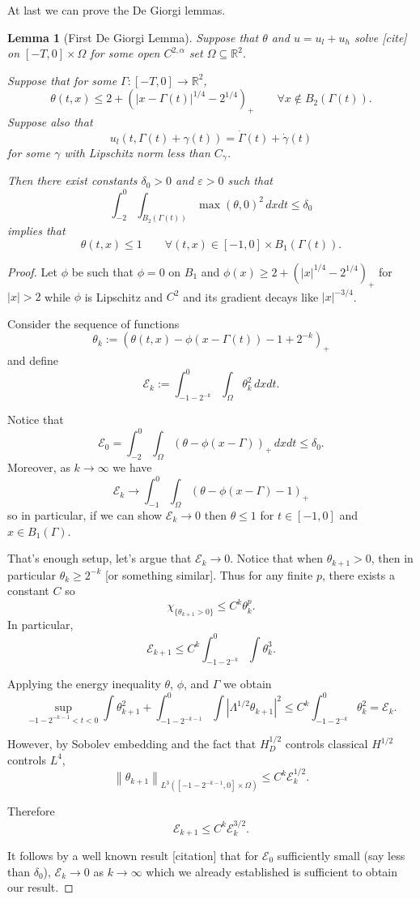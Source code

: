 \documentclass[11pt]{amsart}
\newtheorem{lemma}[theorem]{Lemma}
\theoremstyle{remark}
\theoremstyle{definition}
\newcommand{\R}{\mathbb{R}}
\newcommand{\E}{\mathcal{E}}
\newcommand{\eps}{\varepsilon}
\newcommand{\norm}[1]{\left\lVert#1\right\rVert}
\newcommand{\paren}[1]{\left( #1 \right)}
\newcommand{\abs}[1]{\left\lvert #1 \right\rvert}
\newcommand{\indic}[1]{\chi_{\{#1\}}}
\newcommand{\ulow}{u_l}
\newcommand{\uhigh}{u_h}
\begin{document}
At last we can prove the De Giorgi lemmas.  

\begin{lemma}[First De Giorgi Lemma] \label{thm:DG1}
Suppose that $\theta$ and $u = \ulow + \uhigh$ solve [cite] on $[-T,0]\times \Omega$ for some open $C^{2,\alpha}$ set $\Omega \subseteq \R^2$.  

Suppose that for some $\Gamma:[-T,0]\to \R^2$, 
\[ \theta(t,x) \leq 2 + \paren{|x-\Gamma(t)|^{1/4}-2^{1/4}}_+ \qquad \forall x \notin B_2(\Gamma(t)). \]
Suppose also that
\[ \ulow(t,\Gamma(t)+\gamma(t)) = \dot{\Gamma}(t) + \dot{\gamma}(t) \]
for some $\gamma$ with Lipschitz norm less than $C_\gamma$.  

Then there exist constants $\delta_0>0$ and $\eps > 0$ such that
\[ \int_{-2}^0 \int_{B_2(\Gamma(t))} \max(\theta,0)^2 \,dxdt \leq \delta_0 \]
implies that
\[ \theta(t,x) \leq 1 \qquad \forall (t,x) \in [-1,0]\times B_1(\Gamma(t)). \]

\end{lemma}

\begin{proof}
Let $\phi$ be such that $\phi = 0$ on $B_1$ and $\phi(x) \geq 2 + \paren{|x|^{1/4}-2^{1/4}}_+$ for $|x|>2$ while $\phi$ is Lipschitz and $C^2$ and its gradient decays like $|x|^{-3/4}$.  

Consider the sequence of functions
\[ \theta_k := (\theta(t,x) - \phi(x - \Gamma(t)) - 1 + 2^{-k})_+ \]
and define
\[ \E_k := \int_{-1-2^{-k}}^0 \int_\Omega \theta_k^2 \,dxdt. \]

Notice that
\[ \E_0 = \int_{-2}^0 \int_\Omega (\theta - \phi(x-\Gamma))_+ \,dxdt \leq \delta_0. \]
Moreover, as $k \to \infty$ we have
\[ \E_k \to \int_{-1}^0 \int_\Omega (\theta - \phi(x-\Gamma) - 1)_+ \]
so in particular, if we can show $\E_k \to 0$ then $\theta \leq 1$ for $t \in [-1,0]$ and $x \in B_1(\Gamma)$.  

That's enough setup, let's argue that $\E_k \to 0$.  Notice that when $\theta_{k+1}>0$, then in particular $\theta_k \geq 2^{-k}$ [or something similar].  Thus for any finite $p$, there exists a constant $C$ so
\[ \indic{\theta_{k+1}>0} \leq C^k \theta_k^p. \]
In particular,
\[ \E_{k+1} \leq C^k \int_{-1-2^{-k}}^0 \int \theta_k^3. \]

Applying the energy inequality $\theta$, $\phi$, and $\Gamma$ we obtain
\[ \sup_{-1-2^{-k-1}<t<0} \int \theta_{k+1}^2 + \int_{-1-2^{-k-1}}^0 \int \abs{\Lambda^{1/2}\theta_{k+1}}^2 \leq C^k \int_{-1-2^{-k}}^0 \theta_k^2 = \E_k. \]

However, by Sobolev embedding and the fact that $H_D^{1/2}$ controls classical $H^{1/2}$ controls $L^4$,
\[ \norm{\theta_{k+1}}_{L^3([-1-2^{-k-1},0]\times\Omega)} \leq C^k \E_k^{1/2}. \]

Therefore
\[ \E_{k+1} \leq C^k \E_k^{3/2}. \]

It follows by a well known result [citation] that for $\E_0$ sufficiently small (say less than $\delta_0$), $\E_k \to 0$ as $k \to \infty$ which we already established is sufficient to obtain our result.  
\end{proof}
\end{document}

